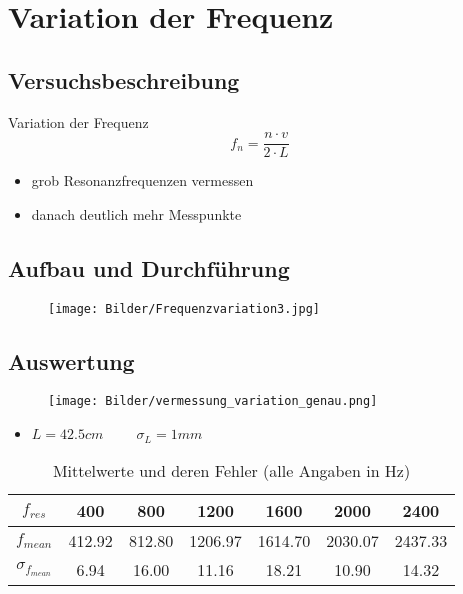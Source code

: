 \documentclass[11pt]{beamer}
\begin{document}


\section{Variation der Frequenz}
\subsection{Versuchsbeschreibung}
\begin{frame}{Variation der Frequenz}
\begin{equation*}
f_n = \frac{n\cdot v}{2\cdot L}
\end{equation*}
\begin{itemize}
\item grob Resonanzfrequenzen vermessen
\item danach deutlich mehr Messpunkte
\end{itemize} 
\end{frame}

\subsection{Aufbau und Durchführung}
\begin{frame}
\begin{figure}[H]
\centering
\texttt{[image: Bilder/Frequenzvariation3.jpg]}
\end{figure}
\end{frame}

\subsection{Auswertung}
\begin{frame}
\begin{figure}[H]
\centering
\texttt{[image: Bilder/vermessung\_variation\_genau.png]}
\end{figure}
\end{frame}

\begin{frame}
\begin{itemize}
\item $L=42.5 cm \hspace{1cm} \sigma_{L} = 1 mm$
\end{itemize}
\begin{table}[H]
\begin{tabular}{c|c|c|c|c|c|c}
$f_{res}$ &400&800&1200&1600&2000&2400\\ 
\hline 
$f_{mean}$ & 412.92 & 812.80 & 1206.97 & 1614.70 & 2030.07 & 2437.33 \\ 
\hline 
$\sigma_{f_{mean}}$ & 6.94 & 16.00 & 11.16 & 18.21 & 10.90 & 14.32 \\ 
\end{tabular}
\caption{Mittelwerte und deren Fehler (alle Angaben in Hz)} 
\end{table}

\end{frame}
\end{document}
